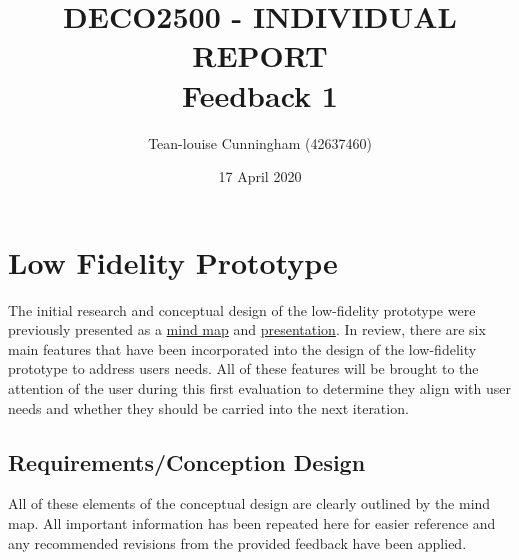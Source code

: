 \documentclass[a4 paper, 12pt]{article}
\title{DECO2500 - INDIVIDUAL REPORT \\ Feedback 1}
\author{Tean-louise Cunningham (42637460)}
\date{17 April 2020}
\begin{document}
\section{Low Fidelity Prototype}
The initial research and conceptual design of the low-fidelity prototype were previously presented as a \href{run:../MindMap/MindMap.pdf}{mind map} and \href{https://youtu.be/BRX7kF7ynSQ}{presentation}. In review, there are six main features that have been incorporated into the design of the low-fidelity prototype to address users needs. All of these features will be brought to the attention of the user during this first evaluation to determine they align with user needs and whether they should be carried into the next iteration.

    \subsection{Requirements/Conception Design}
    All of these elements of the conceptual design are clearly outlined by the mind map. All important information has been repeated here for easier reference and any recommended revisions from the provided feedback have been applied.
\end{document}
